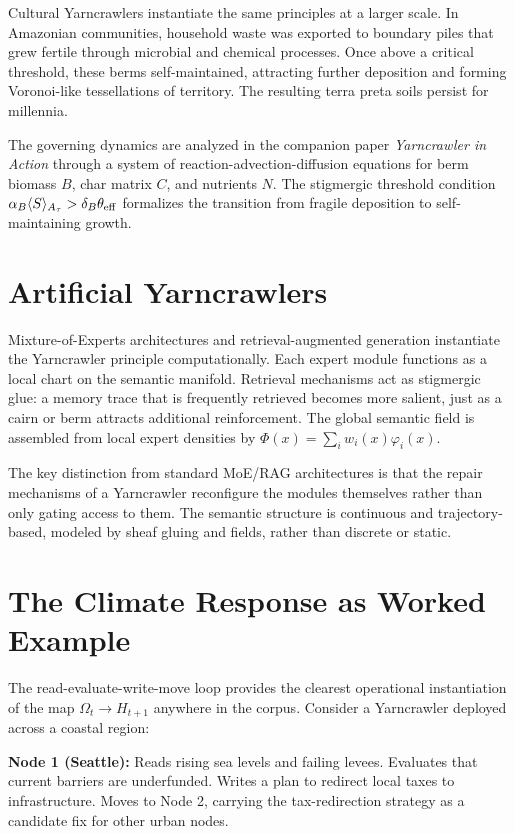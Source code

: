 Cultural Yarncrawlers instantiate the same principles at a larger scale. In Amazonian
communities, household waste was exported to boundary piles that grew fertile through
microbial and chemical processes. Once above a critical threshold, these berms
self-maintained, attracting further deposition and forming Voronoi-like tessellations
of territory. The resulting terra preta soils persist for millennia.

The governing dynamics are analyzed in the companion paper \emph{Yarncrawler in
Action} through a system of reaction-advection-diffusion equations for berm biomass
$B$, char matrix $C$, and nutrients $N$. The stigmergic threshold condition
$\alpha_B \langle S \rangle_{A_\tau} > \delta_B \theta_{\rm eff}$ formalizes the
transition from fragile deposition to self-maintaining growth.

\section{Artificial Yarncrawlers}

Mixture-of-Experts architectures and retrieval-augmented generation instantiate the
Yarncrawler principle computationally. Each expert module functions as a local chart
on the semantic manifold. Retrieval mechanisms act as stigmergic glue: a memory trace
that is frequently retrieved becomes more salient, just as a cairn or berm attracts
additional reinforcement. The global semantic field is assembled from local expert
densities by $\Phi(x) = \sum_i w_i(x)\varphi_i(x)$.

The key distinction from standard MoE/RAG architectures is that the repair mechanisms
of a Yarncrawler reconfigure the modules themselves rather than only gating access to
them. The semantic structure is continuous and trajectory-based, modeled by sheaf
gluing and \RSVP fields, rather than discrete or static.

\section{The Climate Response as Worked Example}

The read-evaluate-write-move loop provides the clearest operational instantiation of
the \KES map $\Omega_t \to H_{t+1}$ anywhere in the corpus. Consider a Yarncrawler
deployed across a coastal region:

\medskip
\noindent\textbf{Node 1 (Seattle):} Reads rising sea levels and failing levees.
Evaluates that current barriers are underfunded. Writes a plan to redirect local
taxes to infrastructure. Moves to Node 2, carrying the tax-redirection strategy
as a candidate fix for other urban nodes.

